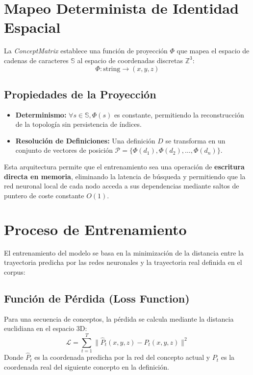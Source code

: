\documentclass[12pt]{article}
\begin{document}
\section{Mapeo Determinista de Identidad Espacial}

La \textit{ConceptMatrix} establece una función de proyección $\Phi$ que mapea el espacio de cadenas de caracteres $\mathbb{S}$ al espacio de coordenadas discretas $\mathbb{Z}^3$:
\[ \Phi: \text{string} \to (x, y, z) \]

\subsection{Propiedades de la Proyección}
\begin{itemize}
    \item \textbf{Determinismo:} $\forall s \in \mathbb{S}, \Phi(s)$ es constante, permitiendo la reconstrucción de la topología sin persistencia de índices.
    \item \textbf{Resolución de Definiciones:} Una definición $D$ se transforma en un conjunto de vectores de posición $\mathcal{P} = \{ \Phi(d_1), \Phi(d_2), \dots, \Phi(d_n) \}$.
\end{itemize}

Esta arquitectura permite que el entrenamiento sea una operación de \textbf{escritura directa en memoria}, eliminando la latencia de búsqueda y permitiendo que la red neuronal local de cada nodo acceda a sus dependencias mediante saltos de puntero de coste constante $O(1)$.







\section{Proceso de Entrenamiento}
El entrenamiento del modelo se basa en la minimización de la distancia entre la trayectoria predicha por las redes neuronales y la trayectoria real definida en el corpus:

\subsection{Función de Pérdida (Loss Function)}
Para una secuencia de conceptos, la pérdida se calcula mediante la distancia euclidiana en el espacio 3D:
$$\mathcal{L} = \sum_{t=1}^{T} \| \hat{P}_t(x,y,z) - P_t(x,y,z) \|^2$$
Donde $\hat{P}_t$ es la coordenada predicha por la red del concepto actual y $P_t$ es la coordenada real del siguiente concepto en la definición.
\end{document}
